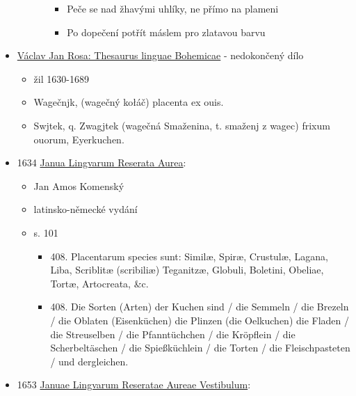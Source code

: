 \begin{itemize}
\begin{itemize}
\begin{itemize}
      \begin{itemize}
      \tightlist
      \item
        Peče se nad žhavými uhlíky, ne přímo na plameni
      \item
        Po dopečení potřít máslem pro zlatavou barvu
      \end{itemize}
    \end{itemize}
  \end{itemize}
\item
  \href{https://bara.ujc.cas.cz/slovniky/rosa/rosafst1480.html}{Václav
  Jan Rosa: Thesaurus linguae Bohemicae} - nedokončený dílo

  \begin{itemize}
  \tightlist
  \item
    žil 1630-1689
  \item
    Wagečnjk, (wagečný kołáč) placenta ex ouis.
  \item
    Swjtek, q. Zwagjtek (wagečná Smaženina, t. smaženj z wagec) frixum
    ouorum, Eyerkuchen.
  \end{itemize}
\item
  1634
  \href{https://ceskadigitalniknihovna.cz/uuid/uuid:e8cd9396-bbda-47f7-aac7-3f4a843367f6}{Janua
  Lingvarum Reserata Aurea}:

  \begin{itemize}
  \tightlist
  \item
    Jan Amos Komenský
  \item
    latinsko-německé vydání
  \item
    s. 101

    \begin{itemize}
    \tightlist
    \item
      408. Placentarum species sunt: Similæ, Spiræ, Crustulæ, Lagana,
      Liba, Scriblitæ (scribiliæ) Teganitzæ, Globuli, Boletini, Obeliae,
      Tortæ, Artocreata, \&c.
    \item
      408. Die Sorten (Arten) der Kuchen sind / die Semmeln / die
      Brezeln / die Oblaten (Eisenküchen) die Plinzen (die Oelkuchen)
      die Fladen / die Streuselben / die Pfanntüchchen / die Kröpflein /
      die Scherbeltäschen / die Spießküchlein / die Torten / die
      Fleischpasteten / und dergleichen.
    \end{itemize}
  \end{itemize}
\item
  1653
  \href{https://ceskadigitalniknihovna.cz/uuid/uuid:849c5567-5ea1-4490-835d-eca31d9b479c}{Januae
  Lingvarum Reseratae Aureae Vestibulum}:


\end{itemize}
